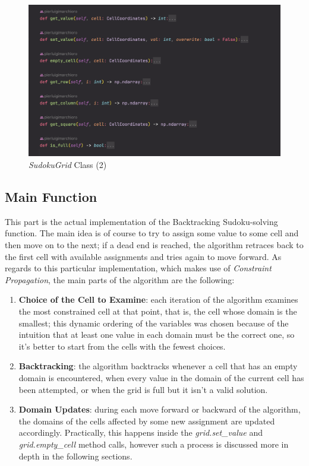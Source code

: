 \begin{figure}[h]
    \centering
    \includegraphics[scale=0.65]{assignment-1/images/cp/data-2_2-grid.png}
    \caption{\textit{SudokuGrid} Class (2)}
    \label{fig:data_2_2}
\end{figure}


\subsection{Main Function}

This part is the actual implementation of the Backtracking Sudoku-solving function. The main idea is of course to try to assign some value to some cell and then move on to the next; if a dead end is reached, the algorithm retraces back to the first cell with available assignments and tries again to move forward. 
As regards to this particular implementation, which makes use of \textit{Constraint Propagation}, the main parts of the algorithm are the following:

\begin{enumerate}
    \item \textbf{Choice of the Cell to Examine}: each iteration of the algorithm examines the most constrained cell at that point, that is, the cell whose domain is the smallest; this dynamic ordering of the variables was chosen because of the intuition that at least one value in each domain must be the correct one, so it's better to start from the cells with the fewest choices.

    \item \textbf{Backtracking}: the algorithm backtracks whenever a cell that has an empty domain is encountered, when every value in the domain of the current cell has been attempted, or when the grid is full but it isn't a valid solution.

    \item \textbf{Domain Updates}: during each move forward or backward of the algorithm, the domains of the cells affected by some new assignment are updated accordingly. Practically, this happens inside the \textit{grid.set\_value} and \textit{grid.empty\_cell} method calls, however such a process is discussed more in depth in the following sections.
\end{enumerate}

